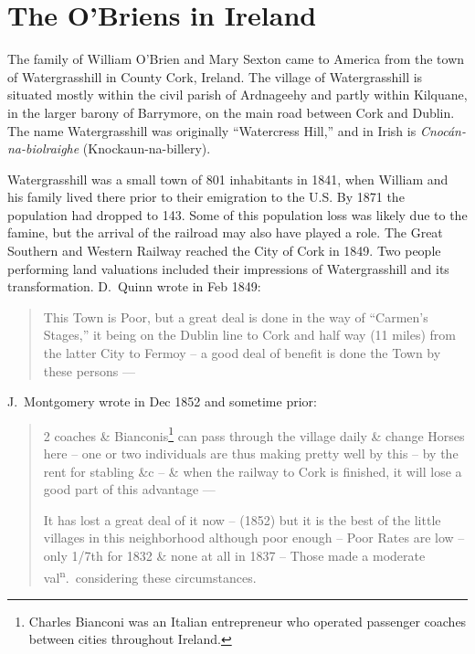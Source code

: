 \chapter{The O'Briens in Ireland}

The family of William O'Brien and Mary Sexton came to America from the town of Watergrasshill in County Cork, Ireland.\citep{Edward2OBrienNaturalization,Michael2OBrienNaturalization,Margaret3DooleyBaptism} The village of Watergrasshill is situated mostly within the civil parish of Ardnageehy and partly within Kilquane, in the larger barony of Barrymore, on the main road between Cork and Dublin.\citep{TopographicalDictionary} The name Watergrasshill was originally ``Watercress Hill,'' and in Irish is \textit{Cnoc\'{a}n-na-biolraighe} (Knockaun-na-billery).\citep{LocalNames} 

Watergrasshill was a small town of 801 inhabitants in 1841, when William and his family lived there prior to their emigration to the U.S. By 1871 the population had dropped to 143.\citep{Population} Some of this population loss was likely due to the famine, but the arrival of the railroad may also have played a role. The Great Southern and Western Railway reached the City of Cork in 1849.\citep{Bianconi} Two people performing land valuations included their impressions of Watergrasshill and its transformation. D.\ Quinn wrote in Feb 1849:

\begin{quote}
	This Town is Poor, but a great deal is done in the way of ``Carmen's Stages,'' it being on the Dublin line to Cork and half way (11 miles) from the latter City to Fermoy -- a good deal of benefit is done the Town by these persons ---\citep{HouseIntro}
\end{quote}

J.\ Montgomery wrote in Dec 1852 and sometime prior:

\begin{quote}
	2 coaches \& Bianconis\footnote{Charles Bianconi was an Italian entrepreneur who operated passenger coaches between cities throughout Ireland.\citep{Bianconi}} can pass through the village daily \& change Horses here -- one or two individuals are thus making pretty well by this -- by the rent for stabling \&c -- \& when the railway to Cork is finished, it will lose a good part of this advantage ---
	
	It has lost a great deal of it now -- (1852) but it is the best of the little villages in this neighborhood although poor enough -- Poor Rates are low -- only 1/7th for 1832 \& none at all in 1837 -- Those made a moderate val\textsuperscript{n}.\ considering these circumstances.\citep{HouseIntro}
\end{quote}

